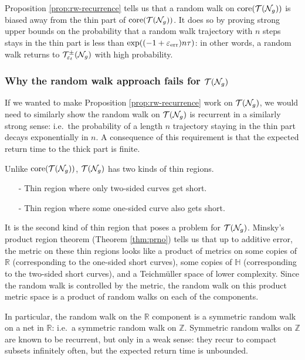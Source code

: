 Proposition \ref{prop:rw-recurrence} tells us that a random walk on $\mathrm{core}(\mathcal{T}(\mathcal{N}_g))$ is biased away from the thin part of $\mathrm{core}(\mathcal{T}(\mathcal{N}_g))$.
It does so by proving strong upper bounds on the probability that a random walk trajectory with $n$ steps stays in the thin part is less than $\exp((-1 + \varepsilon_{\mathrm{err}})n\tau)$: in other words, a random walk returns to $\mathcal{T}_{\varepsilon_t}^{\pm}(\mathcal{N}_g)$ with high probability.

\subsubsection{Why the random walk approach fails for $\mathcal{T}(\mathcal{N}_g)$}
\label{sec:why-approach-fails}

If we wanted to make Proposition \ref{prop:rw-recurrence} work on $\mathcal{T}(\mathcal{N}_g)$, we would need to similarly show the random walk on $\mathcal{T}(\mathcal{N}_g)$ is recurrent in a similarly strong sense: i.e.\ the probability of a length $n$ trajectory staying in the thin part decays exponentially in $n$.
A consequence of this requirement is that the expected return time to the thick part is finite.

Unlike $\mathrm{core}(\mathcal{T}(\mathcal{N}_g))$, $\mathcal{T}(\mathcal{N}_g)$ has two kinds of thin regions.
\begin{itemize}
\item[-] Thin region where only two-sided curves get short.
\item[-] Thin region where some one-sided curve also gets short.
\end{itemize}

It is the second kind of thin region that poses a problem for $\mathcal{T}(\mathcal{N}_g)$.
Minsky's product region theorem (Theorem \ref{thm:prno}) tells us that up to additive error, the metric on these thin regions looks like a product of metrics on some copies of $\mathbb{R}$ (corresponding to the one-sided short curves), some copies of $\mathbb{H}$ (corresponding to the two-sided short curves), and a Teichmüller space of lower complexity.
Since the random walk is controlled by the metric, the random walk on this product metric space is a product of random walks on each of the components.

In particular, the random walk on the $\mathbb{R}$ component is a symmetric random walk on a net in $\mathbb{R}$: i.e.\ a symmetric random walk on $\mathbb{Z}$.
Symmetric random walks on $\mathbb{Z}$ are known to be recurrent, but only in a weak sense: they recur to compact subsets infinitely often, but the expected return time is unbounded.

